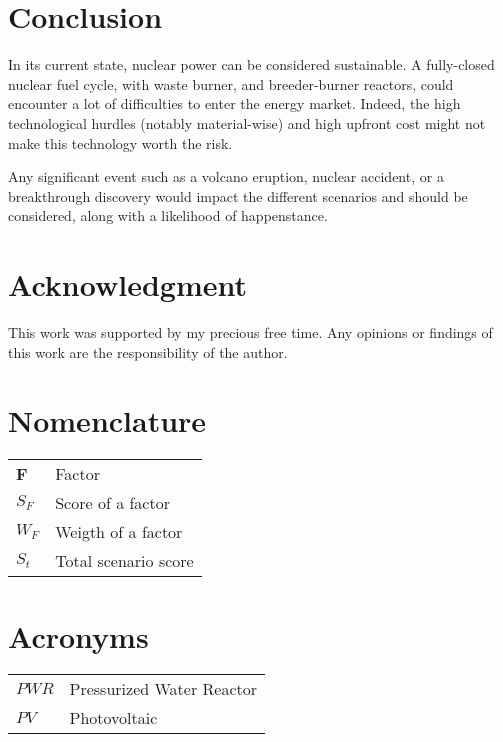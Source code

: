 \documentclass[IJPHM, 2017, 29]{PHMSociety}
\begin{document}
\section{Conclusion}
\label{sec:conclusion}

In its current state, nuclear power can be considered sustainable. A fully-closed nuclear fuel cycle, with waste burner, and breeder-burner reactors, could encounter a lot of difficulties to enter the energy market. Indeed, the high technological hurdles (notably material-wise) and high upfront cost might not make this technology worth the risk.

Any significant event such as a volcano eruption, nuclear accident, or a breakthrough discovery would impact the different scenarios and should be considered, along with a likelihood of happenstance.


\section*{Acknowledgment}
This work was supported by my precious free time. Any opinions or findings of this work are the responsibility of the author.




\section*{Nomenclature}

\begin{tabular}{ l  l }
    \textbf{F}           &Factor\\
    \textbf{$S_F$}           &Score of a factor\\
    \textbf{$W_F$}           &Weigth of a factor\\
    \textbf{$S_t$}           &Total scenario score\\
 \end{tabular}


\section*{Acronyms}

\begin{tabular}{ l  l }
    $PWR$           &Pressurized Water Reactor\\
    $PV$          &Photovoltaic
 \end{tabular}


\clearpage

\end{document}
